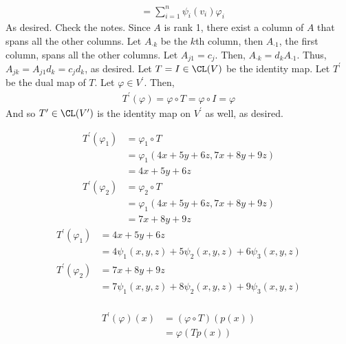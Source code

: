 \documentclass{book}
\begin{document}
\begin{enumerate}[label=\arabic*)]
\begin{align*}
        & = \sum_{i = 1}^{n}\psi_i(v_i)\varphi_i
      \end{align*}
      As desired.
    \ii
      Check the notes.
    \ii
      Since $A$ is rank 1, there exist a column of $A$ that spans all the other columns. Let $A_{\cdot k}$ be the $k$th column, then $A_{\cdot 1}$, the first column, spans all the other
      columns. Let $A_{j1} = c_j$. Then, $A_{\cdot k} = d_kA_{\cdot 1}$. Thus,$A_{jk} = A_{j1}d_k = c_jd_k$, as desired.
    \ii
      Let $T = I \in \CL(V)$ be the identity map. Let $T^{\prime}$ be the dual map of $T$. Let $\varphi \in V^{\prime}$. Then,
      \begin{align*}
        T^{\prime}(\varphi) = \varphi \circ T = \varphi \circ I = \varphi
      \end{align*}
      And so $T^{\prime} \in \CL(V^{\prime})$ is the identity map on $V^{\prime}$ as well, as desired.
    \ii
      \begin{enumerate}[label=\alph*)]
        \ii 
          \begin{align*}
            T^{\prime}(\varphi_1) & = \varphi_1 \circ T \\
            & = \varphi_1(4x + 5y + 6z, 7x + 8y + 9z) \\
            & = 4x + 5y + 6z \\
            T^{\prime}(\varphi_2) & = \varphi_2 \circ T \\
            & = \varphi_1(4x + 5y + 6z, 7x + 8y + 9z) \\
            & = 7x + 8y + 9z
          \end{align*}
        \ii 
          \begin{align*}
            T^{\prime}(\varphi_1) & = 4x + 5y + 6z \\
            & = 4\psi_1(x, y, z) + 5\psi_2(x, y, z) + 6\psi_3(x, y, z) \\
            T^{\prime}(\varphi_2) & = 7x + 8y + 9z \\
            & = 7\psi_1(x, y, z) + 8\psi_2(x, y, z) + 9\psi_3(x, y, z) \\
          \end{align*}
      \end{enumerate}
    \ii
      \begin{enumerate}[label=\alph*)]
        \ii 
          \begin{align*}
            T^{\prime}(\varphi)(x) & = (\varphi \circ T)\left( p(x) \right) \\
            & = \varphi\left( Tp(x) \right) \\

\end{align*}
\end{enumerate}
\end{enumerate}
\end{document}
